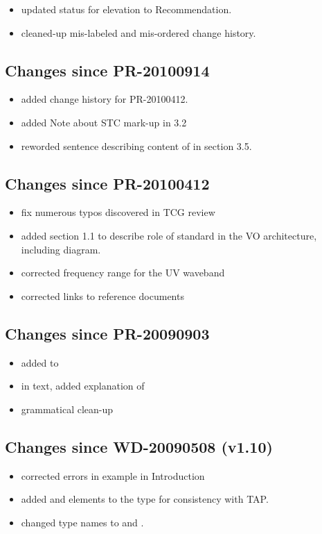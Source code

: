 \documentclass[11pt,a4paper]{ivoa}
\begin{document}
\begin{itemize}
  \item updated status for elevation to Recommendation.
  \item cleaned-up mis-labeled and mis-ordered change history.
\end{itemize}

\subsection{Changes since PR-20100914}

\begin{itemize}
  \item added change history for PR-20100412.
  \item added Note about STC mark-up in 3.2
  \item reworded sentence describing content of  in
       section 3.5.
\end{itemize}

\subsection{Changes since PR-20100412}

\begin{itemize}
  \item fix numerous typos discovered in TCG review
  \item added section 1.1 to describe role of standard in the VO
       architecture, including diagram.
  \item corrected frequency range for the UV waveband
  \item corrected links to reference documents
\end{itemize}

\subsection{Changes since PR-20090903}

\begin{itemize}
  \item added 
       to 
  \item in text, added explanation of
  \item grammatical clean-up
\end{itemize}

\subsection{Changes since WD-20090508 (v1.10)}

\begin{itemize}
  \item corrected errors in example in Introduction
  \item added  and
        elements to the
        type for consistency with TAP.
  \item changed type names  to
        and 
       .
\end{itemize}


\end{document}

